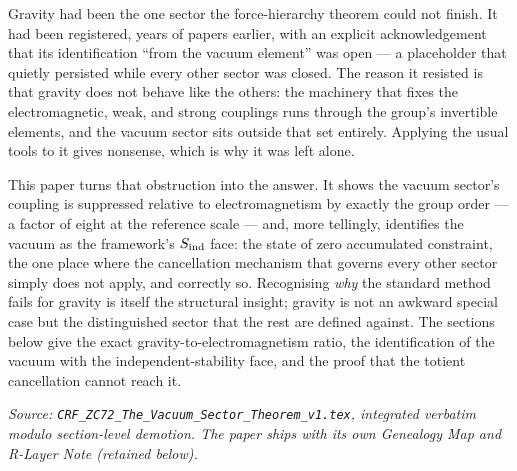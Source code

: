 \documentclass[12pt, a4paper]{article}
\begin{document}
Gravity had been the one sector the force-hierarchy theorem could not finish.
It had been registered, years of papers earlier, with an explicit
acknowledgement that its identification ``from the vacuum element'' was open ---
a placeholder that quietly persisted while every other sector was closed. The
reason it resisted is that gravity does not behave like the others: the
machinery that fixes the electromagnetic, weak, and strong couplings runs
through the group's invertible elements, and the vacuum sector sits outside
that set entirely. Applying the usual tools to it gives nonsense, which is why
it was left alone.

This paper turns that obstruction into the answer. It shows the vacuum
sector's coupling is suppressed relative to electromagnetism by exactly the
group order --- a factor of eight at the reference scale --- and, more
tellingly, identifies the vacuum as the framework's $S_{\rm ind}$ face: the
state of zero accumulated constraint, the one place where the cancellation
mechanism that governs every other sector simply does not apply, and
correctly so. Recognising \emph{why} the standard method fails for gravity is
itself the structural insight; gravity is not an awkward special case but the
distinguished sector that the rest are defined against. The sections below give
the exact gravity-to-electromagnetism ratio, the identification of the vacuum
with the independent-stability face, and the proof that the totient
cancellation cannot reach it.
\label{sec:zc72}

\noindent
\textit{Source: \texttt{CRF\_ZC72\_The\_Vacuum\_Sector\_Theorem\_v1.tex}, integrated verbatim modulo
section-level demotion. The paper ships with its own Genealogy Map
and R-Layer Note (retained below).}

\medskip

\sloppy

\end{document}
